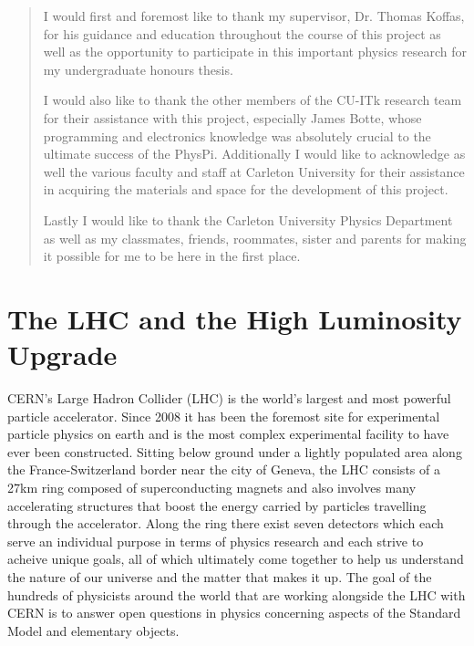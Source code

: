 \documentclass[letterpaper, 11pt]{report}
\begin{document}
\renewcommand{\abstractname}{Acknowledgements}
\begin{abstract}

I would first and foremost like to thank my supervisor, Dr. Thomas Koffas, for his guidance and education throughout the course of this project as well as the opportunity to participate in this important physics research for my undergraduate honours thesis.

I would also like to thank the other members of the CU-ITk research team for their assistance with this project, especially James Botte, whose programming and electronics knowledge was absolutely crucial to the ultimate success of the PhysPi. Additionally I would like to acknowledge as well the various faculty and staff at Carleton University for their assistance in acquiring the materials and space for the development of this project.

Lastly I would like to thank the Carleton University Physics Department as well as my classmates, friends, roommates, sister and parents for making it possible for me to be here in the first place.

\end{abstract}

\tableofcontents

\chapter{The LHC and the High Luminosity Upgrade}

CERN's Large Hadron Collider (LHC) is the world's largest and most powerful particle accelerator.  Since 2008 it has been the foremost site for experimental particle physics on earth and is the most complex experimental facility to have ever been constructed.  Sitting below ground under a lightly populated area along the France-Switzerland border near the city of Geneva, the LHC consists of a 27km ring composed of superconducting magnets and also involves many accelerating structures that boost the energy carried by particles travelling through the accelerator.  Along the ring there exist seven detectors which each serve an individual purpose in terms of physics research and each strive to acheive unique goals, all of which ultimately come together to help us understand the nature of our universe and the matter that makes it up.  The goal of the hundreds of physicists around the world that are working alongside the LHC with CERN is to answer open questions in physics concerning aspects of the Standard Model and elementary objects.
\end{document}
